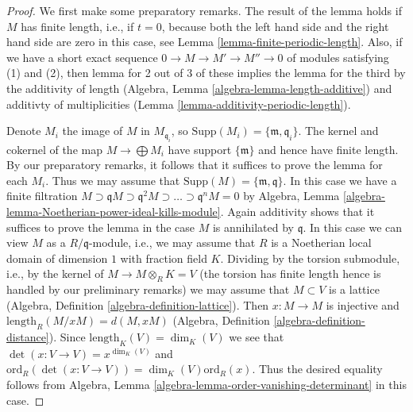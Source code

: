 \documentclass[10pt,a4paper]{amsart}
\theoremstyle{plain}
\theoremstyle{definition}
\theoremstyle{remark}
\numberwithin{equation}{subsection}
\begin{document}
\begin{proof}
We first make some preparatory remarks.
The result of the lemma holds if $M$ has finite length, i.e., if $t = 0$,
because both the left hand side and the right hand side are zero
in this case, see Lemma \ref{lemma-finite-periodic-length}.
Also, if we have a short exact sequence $0 \to M \to M' \to M'' \to 0$
of modules satisfying (1) and (2), then lemma for 2 out of 3
of these implies the lemma for the third by the
additivity of length (Algebra, Lemma \ref{algebra-lemma-length-additive}) and
additivty of multiplicities (Lemma \ref{lemma-additivity-periodic-length}).

\medskip\noindent
Denote $M_i$ the image of $M$ in $M_{\mathfrak q_i}$, so
$\text{Supp}(M_i) = \{\mathfrak m, \mathfrak q_i\}$.
The kernel and cokernel of the map $M \to \bigoplus M_i$
have support $\{\mathfrak m\}$ and hence have finite length.
By our preparatory remarks, it follows that it suffices to
prove the lemma for each $M_i$. Thus we may assume that
$\text{Supp}(M) = \{\mathfrak m, \mathfrak q\}$.
In this case we have a finite filtration
$M \supset \mathfrak qM \supset \mathfrak q^2M \supset \ldots \supset
\mathfrak q^nM = 0$ by Algebra, Lemma
\ref{algebra-lemma-Noetherian-power-ideal-kills-module}.
Again additivity shows that it suffices to prove the lemma
in the case $M$ is annihilated by $\mathfrak q$.
In this case we can view $M$ as a $R/\mathfrak q$-module,
i.e., we may assume that $R$ is a Noetherian local domain
of dimension $1$ with fraction field $K$.
Dividing by the torsion submodule, i.e., by the
kernel of $M \to M \otimes_R K = V$ (the torsion has
finite length hence is handled by our preliminary remarks)
we may assume that $M \subset V$ is a lattice
(Algebra, Definition \ref{algebra-definition-lattice}).
Then $x : M \to M$ is injective and
$\text{length}_R(M/xM) = d(M, xM)$
(Algebra, Definition \ref{algebra-definition-distance}). Since
$\text{length}_K(V) = \dim_K(V)$
we see that $\det(x : V \to V) = x^{\dim_K(V)}$ and
$\text{ord}_R(\det(x : V \to V)) = \dim_K(V) \text{ord}_R(x)$.
Thus the desired equality follows from
Algebra, Lemma \ref{algebra-lemma-order-vanishing-determinant}
in this case.
\end{proof}
\end{document}
